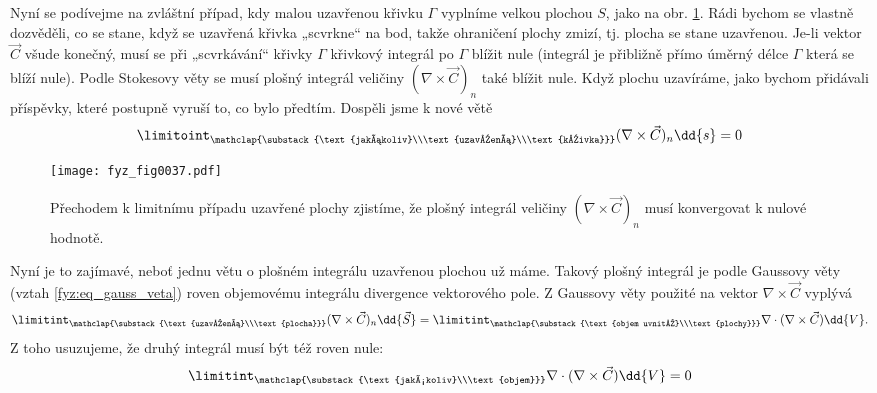           
      Nyní se podívejme na zvláštní případ, kdy malou uzavřenou křivku \(\Gamma\) vyplníme velkou 
      plochou \(S\), jako na obr. \ref{fyz:fig0037}. Rádi bychom se vlastně dozvěděli, co se 
      stane, když se uzavřená křivka „scvrkne“ na bod, takže ohraničení plochy zmizí, tj. plocha se 
      stane uzavřenou. Je-li vektor \(\vec{C}\) všude konečný, musí se při „scvrkávání“ křivky 
      \(\Gamma\) křivkový integrál po \(\Gamma\) blížit nule (integrál je přibližně přímo úměrný 
      délce \(\Gamma\) která se blíží nule). Podle Stokesovy věty se musí plošný integrál veličiny 
      \((\nabla\times\vec{C})_n\) také blížit nule. Když plochu uzavíráme, jako bychom přidávali 
      příspěvky, které postupně vyruší to, co bylo předtím. Dospěli jsme k nové větě
      \begin{equation}\label{fyz:eq_fey_null1} 
        \limitoint_{\mathclap{\substack{\text{jakákoliv}\\\text{uzavřená}\\\text{křivka}}}}
          (\nabla\times\vec{C})_n \dd{s} = 0
      \end{equation}
  
      \begin{figure}[ht!]  %
        \centering
        \texttt{[image: fyz\_fig0037.pdf]}
        \caption{Přechodem k limitnímu případu uzavřené plochy zjistíme, že plošný integrál veličiny
                  \((\nabla\times\vec{C})_n\) musí konvergovat k nulové hodnotě.
                  \cite[s.~60]{Feynman02}}
        \label{fyz:fig0037}
      \end{figure}
      Nyní je to zajímavé, neboť jednu větu o plošném integrálu uzavřenou plochou už máme. Takový 
      plošný integrál je podle Gaussovy věty (vztah \ref{fyz:eq_gauss_veta}) roven objemovému 
      integrálu divergence vektorového pole. Z Gaussovy věty použité na vektor 
      \(\nabla\times\vec{C}\) vyplývá
      \begin{equation}\label{fyz:eq_fey_null2} 
        \limitint_{\mathclap{\substack{\text{uzavřená}\\\text{plocha}}}}
          (\nabla\times\vec{C})_n \dd{\vec{S}}
        =
        \limitint_{\mathclap{\substack{\text{objem uvnitř}\\\text{plochy}}}}
          \nabla\cdot(\nabla\times\vec{C})\dd{V}.
      \end{equation}
      Z toho usuzujeme, že druhý integrál musí být též roven nule:
      \begin{equation}\label{fyz:eq_fey_null3} 
        \limitint_{\mathclap{\substack{\text{jakýkoliv}\\\text{objem}}}}
        \nabla\cdot(\nabla\times\vec{C})\dd{V} = 0
      \end{equation}
              
